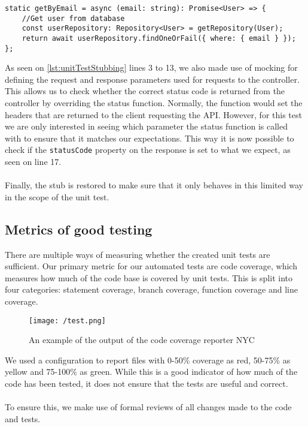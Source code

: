 \begin{lstlisting}[caption={Actual getByEmail function},label={lst:getByEmail}]
static getByEmail = async (email: string): Promise<User> => {
    //Get user from database
    const userRepository: Repository<User> = getRepository(User);
    return await userRepository.findOneOrFail({ where: { email } });
};
\end{lstlisting}
As seen on \autoref{lst:unitTestStubbing} lines 3 to 13, we also made use of mocking for defining the request and response parameters used for requests to the controller.
This allows us to check whether the correct status code is returned from the controller by overriding the status function.
Normally, the function would set the headers that are returned to the client requesting the API.
However, for this test we are only interested in seeing which parameter the status function is called with to ensure that it matches our expectations.
This way it is now possible to check if the \texttt{statusCode} property on the response is set to what we expect, as seen on line 17.
\\\\
Finally, the stub is restored to make sure that it only behaves in this limited way in the scope of the unit test.

\subsection{Metrics of good testing}
There are multiple ways of measuring whether the created unit tests are sufficient.
Our primary metric for our automated tests are code coverage, which measures how much of the code base is covered by unit tests.
This is split into four categories: statement coverage, branch coverage, function coverage and line coverage.

\begin{figure}[H]
    \texttt{[image: /test.png]}
     \caption{An example of the output of the code coverage reporter NYC}
     \label{fig:testResults}
 \end{figure}
We used a configuration to report files with 0-50\% coverage as red, 50-75\% as yellow and 75-100\% as green.
While this is a good indicator of how much of the code has been tested, it does not ensure that the tests are useful and correct.
\\\\
To ensure this, we make use of formal reviews of all changes made to the code and tests.
